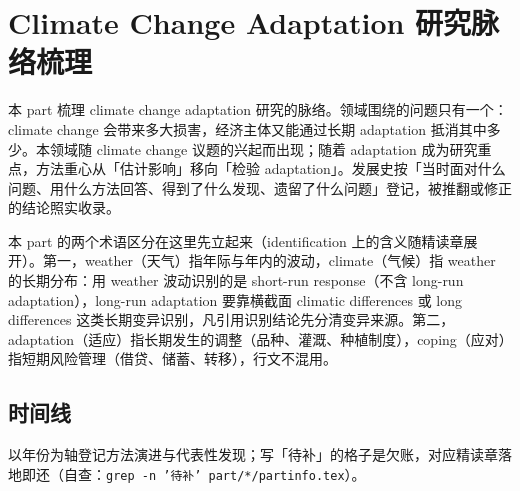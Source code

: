 
\chapter{Climate Change Adaptation 研究脉络梳理}
\label{ch:info-climate-change-adaptation}

本 part 梳理 climate change adaptation 研究的脉络。领域围绕的问题只有一个：climate change 会带来多大损害，经济主体又能通过长期 adaptation 抵消其中多少。本领域随 climate change 议题的兴起而出现；随着 adaptation 成为研究重点，方法重心从「估计影响」移向「检验 adaptation」。发展史按「当时面对什么问题、用什么方法回答、得到了什么发现、遗留了什么问题」登记，被推翻或修正的结论照实收录。


本 part 的两个术语区分在这里先立起来（identification 上的含义随精读章展开）。第一，weather（天气）指年际与年内的波动，climate（气候）指 weather 的长期分布：用 weather 波动识别的是 short-run response（不含 long-run adaptation），long-run adaptation 要靠横截面 climatic differences 或 long differences 这类长期变异识别，凡引用识别结论先分清变异来源。第二，adaptation（适应）指长期发生的调整（品种、灌溉、种植制度），coping（应对）指短期风险管理（借贷、储蓄、转移），行文不混用。

\section{时间线}

以年份为轴登记方法演进与代表性发现；写「待补」的格子是欠账，对应精读章落地即还（自查：\texttt{grep -n '待补' part/*/partinfo.tex}）。

